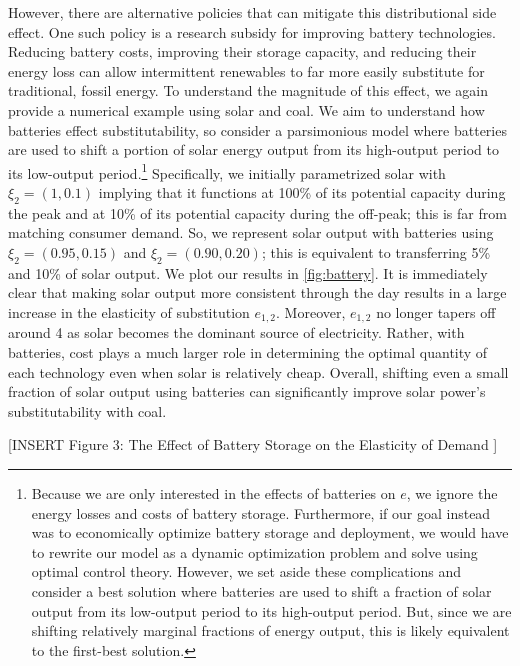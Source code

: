 \documentclass[11pt,a4paper,leqno]{extarticle}
\begin{document}
	However, there are alternative policies that can mitigate this distributional side effect. One such policy is a research subsidy for improving battery technologies. Reducing battery costs, improving their storage capacity, and reducing their  energy loss can allow intermittent renewables to far more easily substitute for traditional, fossil energy. To understand the magnitude of this effect, we again provide a numerical example using solar and coal. We aim to understand how batteries effect substitutability, so consider a parsimonious model where batteries are used to shift a portion of solar energy output from its high-output period to its low-output period.\footnote{Because we are only interested in the effects of batteries on $e$, we ignore the energy losses and costs of battery storage. Furthermore, if our goal instead was to economically optimize battery storage and deployment, we would have to   rewrite our model as a dynamic optimization problem and solve using optimal control theory. However, we set aside these complications and consider a best solution where batteries are used to shift a fraction of solar output from its low-output period to its high-output period. But, since we are shifting relatively marginal fractions of energy output, this is likely equivalent to the first-best solution. } Specifically, we initially parametrized solar with $\xi_{2} = (1, 0.1)$ implying that it functions at 100\% of its potential capacity during the peak and at 10\% of its potential capacity during the off-peak; this is far from matching consumer demand. So, we represent solar output with batteries using $\xi_2 = (0.95, 0.15)$ and $\xi_2 = (0.90, 0.20)$; this is equivalent to transferring 5\% and 10\% of solar output.  We plot our results in \autoref{fig:battery}. It is immediately clear that making solar output more consistent through the day results in a large increase in the elasticity of substitution $e_{1,2}$. Moreover,  $e_{1,2}$ no longer tapers off around 4 as solar becomes the dominant source of electricity. Rather, with batteries, cost plays a much larger role in determining the optimal quantity of each technology even when solar is relatively cheap. Overall, shifting even a small fraction of solar output using batteries can significantly improve solar power's substitutability with coal. 
	
	\vspace{0.15in}
	\begin{center}
		[INSERT Figure 3: The Effect of Battery Storage on the  Elasticity of Demand ]
	\end{center}
	\vspace{0.15in}
	
\end{document}
